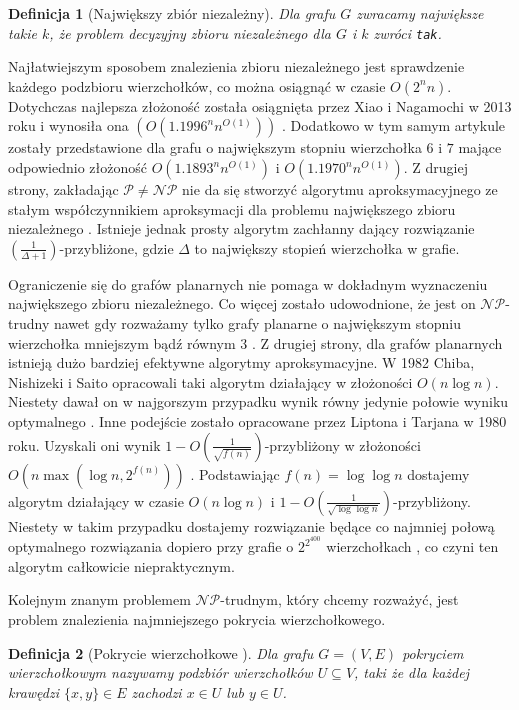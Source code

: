 \documentclass[twoside,a4paper,12pt]{report} %
\theoremstyle{break}
\newtheorem{definition}{Definicja}[section]
\begin{document}
\begin{definition}[Największy zbiór niezależny]
Dla grafu $G$ zwracamy największe takie $k$, że problem decyzyjny zbioru niezależnego dla $G$ i $k$ zwróci \texttt{tak}.
\end{definition}

Najłatwiejszym sposobem znalezienia zbioru niezależnego jest sprawdzenie każdego podzbioru wierzchołków, co można osiągnąć w czasie $O(2^nn)$. Dotychczas najlepsza złożoność została osiągnięta przez Xiao i Nagamochi w 2013 roku i wynosiła ona $(O(1.1996^nn^{O(1)}))$ \cite{xiao}. Dodatkowo w tym samym artykule zostały przedstawione dla grafu o największym stopniu wierzchołka $6$ i $7$ mające odpowiednio złożoność $O(1.1893^nn^{O(1)})$ i $O(1.1970^nn^{O(1)})$. Z drugiej strony, zakładając $\mathcal{P} \neq \mathcal{NP}$ nie da się stworzyć algorytmu aproksymacyjnego ze stałym współczynnikiem aproksymacji dla problemu największego zbioru niezależnego \cite{fpt}. Istnieje jednak prosty algorytm zachłanny dający rozwiązanie $\left(\frac{1}{\Delta + 1}\right)$-przybliżone, gdzie $\Delta$ to największy stopień wierzchołka w grafie.

Ograniczenie się do grafów planarnych nie pomaga w dokładnym wyznaczeniu największego zbioru niezależnego. Co więcej zostało udowodnione, że jest on $\mathcal{NP}$-trudny nawet gdy rozważamy tylko grafy planarne o największym stopniu wierzchołka mniejszym bądź równym $3$ \cite{max_ind}. Z drugiej strony, dla grafów planarnych istnieją dużo bardziej efektywne algorytmy aproksymacyjne. W 1982 Chiba, Nishizeki i Saito opracowali taki algorytm działający w złożoności $O(n\log n)$. Niestety dawał on w najgorszym przypadku wynik równy jedynie połowie wyniku optymalnego \cite{chiba}. Inne podejście zostało opracowane przez Liptona i Tarjana w 1980 roku. Uzyskali oni wynik $1 - O(\frac{1}{\sqrt{f(n)}})$-przybliżony w złożoności $O(n \max(\log n, 2^{f(n)}))$ \cite{lipton}. Podstawiając $f(n) = \log \log n$ dostajemy algorytm działający w czasie $O(n \log n)$ i $1 - O(\frac{1}{\sqrt{\log \log n}})$-przybliżony. Niestety w takim przypadku dostajemy rozwiązanie będące co najmniej połową optymalnego rozwiązania dopiero przy grafie o $2^{2^{400}}$ wierzchołkach \cite{chiba2}, co czyni ten algorytm całkowicie niepraktycznym.

Kolejnym znanym problemem $\mathcal{NP}$-trudnym, który chcemy rozważyć, jest problem znalezienia najmniejszego pokrycia wierzchołkowego.

\begin{definition}[Pokrycie wierzchołkowe \cite{graph}]
Dla grafu $G=(V,E)$ pokryciem wierzchołkowym nazywamy podzbiór wierzchołków $U \subseteq V$, taki że dla każdej krawędzi $\{x,y\} \in E$ zachodzi $x \in U$ lub $y \in U$.
\end{definition}
\end{document}
